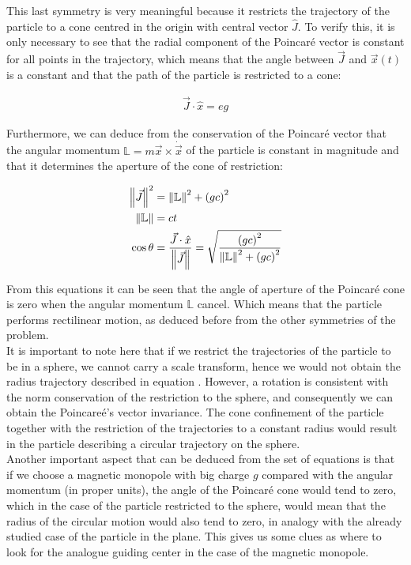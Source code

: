 This last symmetry is very meaningful because it restricts the trajectory of the particle to a cone centred in the origin with central vector $\hat{J}$. To verify this, it is only necessary to see that the radial component of the Poincar\'e vector is constant for all points in the trajectory, which means that the angle between $\vec{J}$ and $\vec{x}(t)$ is a constant and that the path of the particle is restricted to a cone:

\begin{align*}
\vec{J}\cdot\hat{x} = eg
\end{align*}

Furthermore, we can deduce from the conservation of the Poincar\'e vector that the angular momentum $\mathbb{L}= m\vec{x}\times\dot{\vec{x}}$ of the particle is constant in magnitude and that it determines the aperture of the cone of restriction:

\begin{equation}
\begin{aligned}
\left\lVert \vec{J} \right\rVert^2 &= \left\lVert \mathbb{L} \right\rVert^2 +\left( gc \right)^2\\
\left\lVert \mathbb{L} \right\rVert &= ct\\
\cos{\theta} &= \frac{\vec{J}\cdot\hat{x}}{\left\lVert \vec{J} \right\rVert} = \sqrt{\frac{\left( gc \right)^2}{\left\lVert \mathbb{L} \right\rVert^2 +\left( gc \right)^2}}
\end{aligned}
\label{eq:poincarecone}
\end{equation}


From this equations it can be seen that the angle of aperture of the Poincar\'e cone is zero when the angular momentum $\mathbb{L}$ cancel. Which means that the particle performs rectilinear motion, as deduced before from the other symmetries of the problem.\\

It is important to note here that if we restrict the trajectories of the particle to be in a sphere, we cannot carry a scale transform, hence we would not obtain the radius trajectory described in equation . However, a rotation is consistent with the norm conservation of the restriction to the sphere, and consequently we can obtain the Poincare\'e's vector invariance. The cone confinement of the particle together with the restriction of the trajectories to a constant radius would result in the particle describing a circular trajectory on the sphere.\\

Another important aspect that can be deduced from the set of equations  is that if we choose a magnetic monopole with big charge $g$ compared with the angular momentum (in proper units), the angle of the Poincar\'e cone would tend to zero, which in the case of the particle restricted to the sphere, would mean that the radius of the circular motion would also tend to zero, in analogy with the already studied case of the particle in the plane. This gives us some clues as where to look for the analogue guiding center in the case of the magnetic monopole.\\


